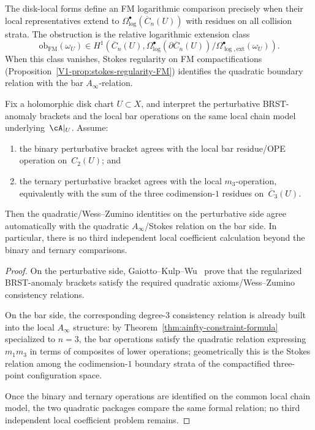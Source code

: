 \begin{remark}\label{rem:disk-local-fm-extension}
The disk-local forms define an FM logarithmic comparison precisely when
their local representatives extend to
\(\Omega^\bullet_{\log}(\overline{C}_n(U))\) with residues on all
collision strata.  The obstruction is the relative logarithmic
extension class
\[
\mathrm{ob}_{\mathrm{FM}}(\omega_U)\in
H^1\!\left(\overline{C}_n(U),
\Omega^\bullet_{\log}(\partial\overline{C}_n(U))
/\Omega^\bullet_{\log,\mathrm{ext}}(\omega_U)\right).
\]
When this class vanishes, Stokes regularity on FM compactifications
\textup{(}Proposition~\textup{\ref{V1-prop:stokes-regularity-FM}}\textup{)}
identifies the quadratic boundary relation with the bar
\(A_\infty\)-relation.
\end{remark}

\begin{proposition}
\label{prop:disk-local-binary-ternary-reduction}
Fix a holomorphic disk chart $U \subset X$, and interpret the
perturbative BRST-anomaly brackets and the local bar operations on the
same local chain model underlying~$\cA|_U$.
Assume:
\begin{enumerate}[label=\textup{(\roman*)}]
\item the binary perturbative bracket agrees with the local bar
 residue/OPE operation on~$C_2(U)$; and
\item the ternary perturbative bracket agrees with the local
 $m_3$-operation, equivalently with the sum of the three
 codimension-$1$ residues on~$\overline{C}_3(U)$.
\end{enumerate}
Then the quadratic/Wess--Zumino identities on the perturbative side
agree automatically with the quadratic $A_\infty$/Stokes relation on
the bar side. In particular, there is no third independent local
coefficient calculation beyond the binary and ternary comparisons.
\end{proposition}

\begin{proof}
On the perturbative side, Gaiotto--Kulp--Wu~\cite{GKW25} prove that the
regularized BRST-anomaly brackets satisfy the required quadratic
axioms/Wess--Zumino consistency relations.

On the bar side, the corresponding degree-$3$ consistency relation is
already built into the local $A_\infty$ structure: by
Theorem~\ref{thm:ainfty-constraint-formula} specialized to $n=3$, the
bar operations satisfy the quadratic relation expressing $m_1m_3$ in
terms of composites of lower operations; geometrically this is the
Stokes relation among the codimension-$1$ boundary strata of the
compactified three-point configuration space.

Once the binary and ternary operations are
identified on the common local chain model, the two quadratic packages
compare the same formal relation; no third
independent local coefficient problem remains.
\end{proof}

